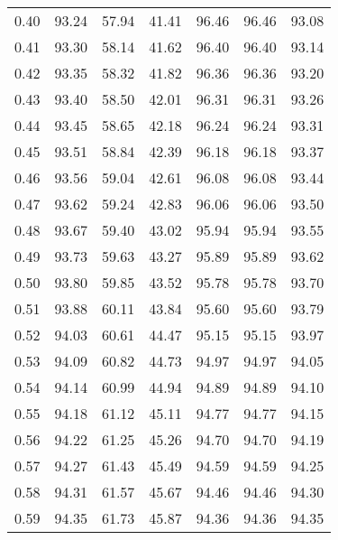\begin{tabular}{|c|c|c|c|c|c|c|}
      0.40 &     93.24 &     57.94 &      41.41 &   96.46 &      96.46 &         93.08 \\
      0.41 &     93.30 &     58.14 &      41.62 &   96.40 &      96.40 &         93.14 \\
      0.42 &     93.35 &     58.32 &      41.82 &   96.36 &      96.36 &         93.20 \\
      0.43 &     93.40 &     58.50 &      42.01 &   96.31 &      96.31 &         93.26 \\
      0.44 &     93.45 &     58.65 &      42.18 &   96.24 &      96.24 &         93.31 \\
      0.45 &     93.51 &     58.84 &      42.39 &   96.18 &      96.18 &         93.37 \\
      0.46 &     93.56 &     59.04 &      42.61 &   96.08 &      96.08 &         93.44 \\
      0.47 &     93.62 &     59.24 &      42.83 &   96.06 &      96.06 &         93.50 \\
      0.48 &     93.67 &     59.40 &      43.02 &   95.94 &      95.94 &         93.55 \\
      0.49 &     93.73 &     59.63 &      43.27 &   95.89 &      95.89 &         93.62 \\
      0.50 &     93.80 &     59.85 &      43.52 &   95.78 &      95.78 &         93.70 \\
      0.51 &     93.88 &     60.11 &      43.84 &   95.60 &      95.60 &         93.79 \\
      0.52 &     94.03 &     60.61 &      44.47 &   95.15 &      95.15 &         93.97 \\
      0.53 &     94.09 &     60.82 &      44.73 &   94.97 &      94.97 &         94.05 \\
      0.54 &     94.14 &     60.99 &      44.94 &   94.89 &      94.89 &         94.10 \\
      0.55 &     94.18 &     61.12 &      45.11 &   94.77 &      94.77 &         94.15 \\
      0.56 &     94.22 &     61.25 &      45.26 &   94.70 &      94.70 &         94.19 \\
      0.57 &     94.27 &     61.43 &      45.49 &   94.59 &      94.59 &         94.25 \\
      0.58 &     94.31 &     61.57 &      45.67 &   94.46 &      94.46 &         94.30 \\
      0.59 &     94.35 &     61.73 &      45.87 &   94.36 &      94.36 &         94.35 \\

\end{tabular}
